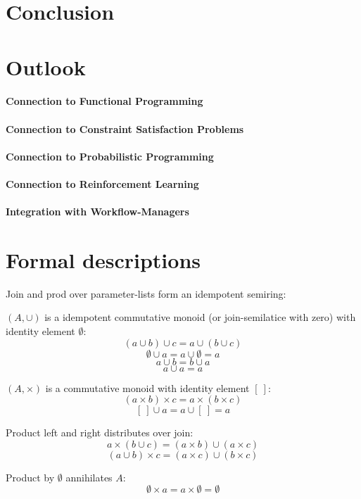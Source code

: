 \documentclass[english]{article}
\begin{document}
\section{Conclusion}

\section{Outlook}
\paragraph{Connection to Functional Programming}
\paragraph{Connection to Constraint Satisfaction Problems}
\paragraph{Connection to Probabilistic Programming}
\paragraph{Connection to Reinforcement Learning}
\paragraph{Integration with Workflow-Managers}

\appendix


\section{Formal descriptions}
Join and prod over parameter-lists form an idempotent semiring:

$(A, \cup)$ is a idempotent commutative monoid (or join-semilatice with zero) with identity element $\emptyset$:
$$(a \cup b) \cup c = a \cup (b \cup c)$$
$$\emptyset \cup a = a \cup \emptyset = a$$
$$a \cup b = b \cup a$$
$$a \cup a = a$$

$(A, \times)$ is a commutative monoid with identity element $[\ ]$:
$$(a \times b) \times c = a \times (b \times c)$$
$$[\ ] \cup a = a \cup [\ ] = a$$

Product left and right distributes over join:
$$a\times(b \cup c) = (a\times b) \cup (a\times c)$$
$$(a \cup b)\times c = (a\times c) \cup (b\times c)$$

Product by $\emptyset$ annihilates $A$:
$$\emptyset \times a = a \times \emptyset = \emptyset$$



\printbibliography
\end{document}
